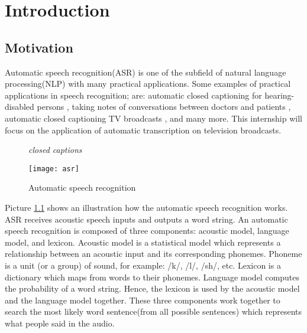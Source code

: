 \chapter{Introduction}

\section{Motivation}
Automatic speech recognition(ASR) is one of the subfield of natural language processing(NLP) with many practical applications. Some examples of practical applications in speech recognition; are: automatic closed captioning for hearing-disabled persons \cite{Patel2010}, taking notes of conversations between doctors and patients \cite{Klann2008}, automatic closed captioning TV broadcasts \cite{Woodland2015}, and many more.
This internship will focus on the application of automatic transcription on television broadcasts.

\begin{figure}[H]\textit{closed captions}
\caption{Automatic speech recognition \cite{ASRImage}}
\texttt{[image: asr]}
\label{AutomaticSpeechRecognition}
\centering
\end{figure}

Picture \ref{AutomaticSpeechRecognition} shows an illustration how the automatic speech recognition works. ASR receives acoustic speech inputs and outputs a word string. An automatic speech recognition is composed of three components: acoustic model, language model, and lexicon. Acoustic model is a statistical model which represents a relationship between an acoustic input and its corresponding phonemes. Phoneme is a unit (or a group) of sound, for example: /k/, /l/, /sh/, etc. Lexicon is a dictionary which maps from words to their phonemes.  Language model computes the probability of a word string. Hence, the lexicon is used by the acoustic model and the language model together.  These three components work together to  search the most likely word sentence(from all possible sentences) which represents what people said in the audio. 


